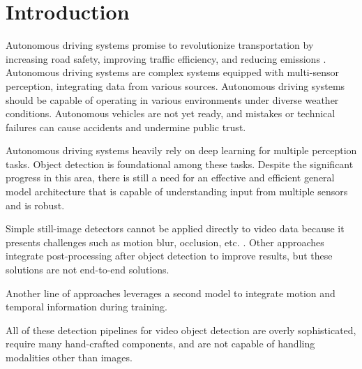 \section{Introduction} \label{Introduction}

Autonomous driving systems promise to revolutionize transportation by increasing road safety, improving traffic efficiency, and reducing emissions \cite{litmanAutonomousVehicleImplementationb}.
Autonomous driving systems are complex systems equipped with multi-sensor perception, integrating data from various sources. Autonomous driving systems should be capable of operating in various environments under diverse weather conditions. Autonomous vehicles are not yet ready, and mistakes or technical failures can cause accidents and undermine public trust.

Autonomous driving systems heavily rely on deep learning for multiple perception tasks. Object detection is foundational among these tasks. Despite the significant progress in this area, there is still a need for an effective and efficient general model architecture that is capable of understanding input from multiple sensors and is robust.


Simple still-image detectors \cite{} cannot be applied directly to video data because it presents challenges such as motion blur, occlusion, etc. \cite{}. Other approaches \cite{hanSeqNMSVideoObject2016, kangTCNNTubeletsConvolutional2018, kangObjectDetectionVideo2016} integrate post-processing after object detection to improve results, but these solutions are not end-to-end solutions.

Another line of approaches \cite{Lu_2017_ICCV, xiaoVideoObjectDetection2018} leverages a second model to integrate motion and temporal information during training.


All of these detection pipelines for video object detection are overly sophisticated, require many hand-crafted components, and are not capable of handling modalities other than images.


